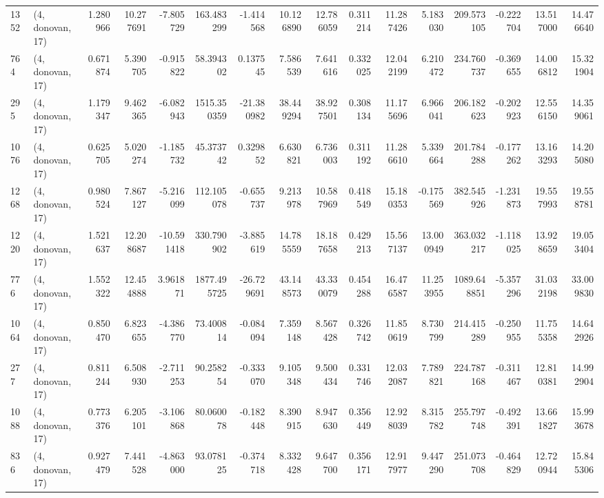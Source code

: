 \begin{tabular}{llrrrrrrrrrrrrrr}
1352 &  (4, donovan, 17) &   1.280966 &  10.277691 &  -7.805729 &    163.483299 &   -1.414568 &   10.126890 &   12.786059 &  0.311214 &  11.287426 &   5.183030 &   209.573105 &  -0.222704 &  13.517000 &  14.476640 \\
764  &  (4, donovan, 17) &   0.671874 &   5.390705 &  -0.915822 &     58.394302 &    0.137545 &    7.586539 &    7.641616 &  0.332025 &  12.042199 &   6.210472 &   234.760737 &  -0.369655 &  14.006812 &  15.321904 \\
295  &  (4, donovan, 17) &   1.179347 &   9.462365 &  -6.082943 &   1515.350359 &  -21.380982 &   38.449294 &   38.927501 &  0.308134 &  11.175696 &   6.966041 &   206.182623 &  -0.202923 &  12.556150 &  14.359061 \\
1076 &  (4, donovan, 17) &   0.625705 &   5.020274 &  -1.185732 &     45.373742 &    0.329852 &    6.630821 &    6.736003 &  0.311192 &  11.286610 &   5.339664 &   201.784288 &  -0.177262 &  13.163293 &  14.205080 \\
1268 &  (4, donovan, 17) &   0.980524 &   7.867127 &  -5.216099 &    112.105078 &   -0.655737 &    9.213978 &   10.587969 &  0.418549 &  15.180353 &  -0.175569 &   382.545926 &  -1.231873 &  19.557993 &  19.558781 \\
1220 &  (4, donovan, 17) &   1.521637 &  12.208687 & -10.591418 &    330.790902 &   -3.885619 &   14.785559 &   18.187658 &  0.429213 &  15.567137 &  13.000949 &   363.032217 &  -1.118025 &  13.928659 &  19.053404 \\
776  &  (4, donovan, 17) &   1.552322 &  12.454888 &   3.961871 &   1877.495725 &  -26.729691 &   43.148573 &   43.330079 &  0.454288 &  16.476587 &  11.253955 &  1089.648851 &  -5.357296 &  31.032198 &  33.009830 \\
1064 &  (4, donovan, 17) &   0.850470 &   6.823655 &  -4.386770 &     73.400814 &   -0.084094 &    7.359148 &    8.567428 &  0.326742 &  11.850619 &   8.730799 &   214.415289 &  -0.250955 &  11.755358 &  14.642926 \\
277  &  (4, donovan, 17) &   0.811244 &   6.508930 &  -2.711253 &     90.258254 &   -0.333070 &    9.105348 &    9.500434 &  0.331746 &  12.032087 &   7.789821 &   224.787168 &  -0.311467 &  12.810381 &  14.992904 \\
1088 &  (4, donovan, 17) &   0.773376 &   6.205101 &  -3.106868 &     80.060078 &   -0.182448 &    8.390915 &    8.947630 &  0.356449 &  12.928039 &   8.315782 &   255.797748 &  -0.492391 &  13.661827 &  15.993678 \\
836  &  (4, donovan, 17) &   0.927479 &   7.441528 &  -4.863000 &     93.078125 &   -0.374718 &    8.332428 &    9.647700 &  0.356171 &  12.917977 &   9.447290 &   251.073708 &  -0.464829 &  12.720944 &  15.845306 \\

\end{tabular}
